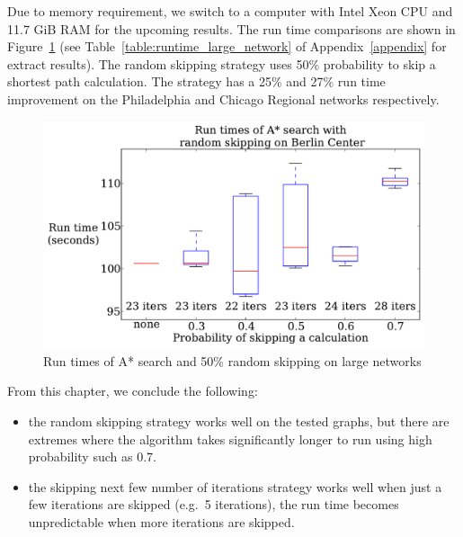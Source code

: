 Due to memory requirement, we switch to a computer with Intel Xeon CPU and 11.7 GiB RAM for the upcoming results.
The run time comparisons are shown in Figure~\ref{fig:large_random_n} (see Table~\ref{table:runtime_large_network} of Appendix~\ref{appendix} for extract results).
The random skipping strategy uses 50\% probability to skip a shortest path calculation.
The strategy has a 25\% and 27\% run time improvement on the Philadelphia and Chicago Regional networks respectively.

\begin{figure}[!hb]
    \centering
    \includegraphics[page=5,width=\textwidth]{img/random_time}
    \caption{Run times of A* search and 50\% random skipping on large networks}
    \label{fig:large_random_n}
\end{figure}

From this chapter, we conclude the following:
\begin{itemize}
    \item the random skipping strategy works well on the tested graphs,
but there are extremes where the algorithm takes significantly longer to run using high probability such as 0.7.
    \item the skipping next few number of iterations strategy works well when just a few iterations are skipped (e.g.\ 5 iterations), the run time becomes unpredictable when more iterations are skipped.
\end{itemize}
